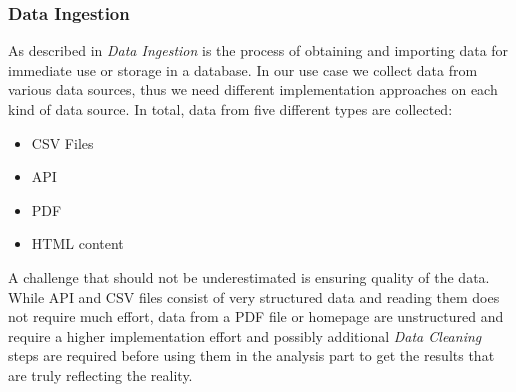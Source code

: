 \subsubsection{Data Ingestion}
\label{subsubsec:ingestion}
As described in \cite{ingestion} \textit{Data Ingestion} is the process of obtaining and importing data for immediate use or storage in a database. In our use case we collect data from various data sources, thus we need different implementation approaches on each kind of data source. \newline
In total, data from five different types are collected:
\begin{itemize}
  \item \ac{CSV} Files
  \item \ac{API}
  \item \acs{PDF}
  \item \acs{HTML} content
\end{itemize}
A challenge that should not be underestimated is ensuring quality of the data.
While \ac{API} and \ac{CSV} files consist of very structured data and reading them does not require much effort,
data from a \ac{PDF} file or homepage are unstructured and require a higher implementation effort and possibly additional
\textit{Data Cleaning} steps are required before using them in the analysis part to get the results that are truly reflecting the reality.
%
